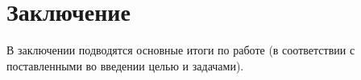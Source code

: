 \newpage

\section*{Заключение} 

В заключении подводятся основные итоги по работе (в соответствии с поставленными во введении целью и задачами).
